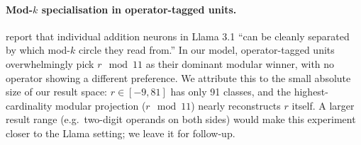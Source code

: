\documentclass[11pt]{article}
\theoremstyle{papsty}
\begin{document}
\paragraph{Mod-$k$ specialisation in operator-tagged units.}
\citet{goodfire2025reusable} report that individual addition neurons in
Llama 3.1 ``can be cleanly separated by which mod-$k$ circle they read
from.''
In our model, operator-tagged units overwhelmingly pick $r\!\mod\!11$
as their dominant modular winner, with no operator showing a different
preference.
We attribute this to the small absolute size of our result space:
$r \in [-9, 81]$ has only 91 classes, and the highest-cardinality
modular projection ($r\!\mod\!11$) nearly reconstructs $r$ itself.
A larger result range (e.g.\ two-digit operands on both sides) would
make this experiment closer to the Llama setting; we leave it for
follow-up.



\end{document}
